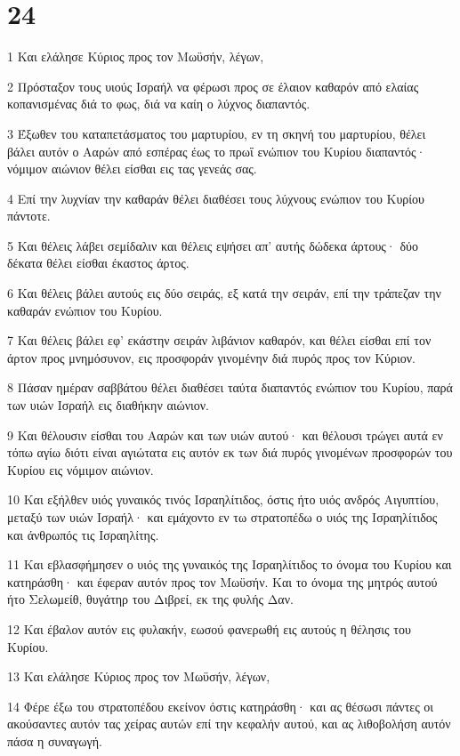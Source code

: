 \chapter{24}

\par 1 Και ελάλησε Κύριος προς τον Μωϋσήν, λέγων,
\par 2 Πρόσταξον τους υιούς Ισραήλ να φέρωσι προς σε έλαιον καθαρόν από ελαίας κοπανισμένας διά το φως, διά να καίη ο λύχνος διαπαντός.
\par 3 Έξωθεν του καταπετάσματος του μαρτυρίου, εν τη σκηνή του μαρτυρίου, θέλει βάλει αυτόν ο Ααρών από εσπέρας έως το πρωΐ ενώπιον του Κυρίου διαπαντός· νόμιμον αιώνιον θέλει είσθαι εις τας γενεάς σας.
\par 4 Επί την λυχνίαν την καθαράν θέλει διαθέσει τους λύχνους ενώπιον του Κυρίου πάντοτε.
\par 5 Και θέλεις λάβει σεμίδαλιν και θέλεις εψήσει απ' αυτής δώδεκα άρτους· δύο δέκατα θέλει είσθαι έκαστος άρτος.
\par 6 Και θέλεις βάλει αυτούς εις δύο σειράς, εξ κατά την σειράν, επί την τράπεζαν την καθαράν ενώπιον του Κυρίου.
\par 7 Και θέλεις βάλει εφ' εκάστην σειράν λιβάνιον καθαρόν, και θέλει είσθαι επί τον άρτον προς μνημόσυνον, εις προσφοράν γινομένην διά πυρός προς τον Κύριον.
\par 8 Πάσαν ημέραν σαββάτου θέλει διαθέσει ταύτα διαπαντός ενώπιον του Κυρίου, παρά των υιών Ισραήλ εις διαθήκην αιώνιον.
\par 9 Και θέλουσιν είσθαι του Ααρών και των υιών αυτού· και θέλουσι τρώγει αυτά εν τόπω αγίω διότι είναι αγιώτατα εις αυτόν εκ των διά πυρός γινομένων προσφορών του Κυρίου εις νόμιμον αιώνιον.
\par 10 Και εξήλθεν υιός γυναικός τινός Ισραηλίτιδος, όστις ήτο υιός ανδρός Αιγυπτίου, μεταξύ των υιών Ισραήλ· και εμάχοντο εν τω στρατοπέδω ο υιός της Ισραηλίτιδος και άνθρωπός τις Ισραηλίτης.
\par 11 Και εβλασφήμησεν ο υιός της γυναικός της Ισραηλίτιδος το όνομα του Κυρίου και κατηράσθη· και έφεραν αυτόν προς τον Μωϋσήν. Και το όνομα της μητρός αυτού ήτο Σελωμείθ, θυγάτηρ του Διβρεί, εκ της φυλής Δαν.
\par 12 Και έβαλον αυτόν εις φυλακήν, εωσού φανερωθή εις αυτούς η θέλησις του Κυρίου.
\par 13 Και ελάλησε Κύριος προς τον Μωϋσήν, λέγων,
\par 14 Φέρε έξω του στρατοπέδου εκείνον όστις κατηράσθη· και ας θέσωσι πάντες οι ακούσαντες αυτόν τας χείρας αυτών επί την κεφαλήν αυτού, και ας λιθοβολήση αυτόν πάσα η συναγωγή.

